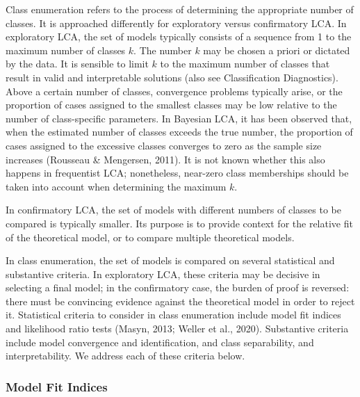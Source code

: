 \documentclass[
  ,man,floatsintext]{apa6}
\begin{document}
Class enumeration refers to the process of determining the appropriate number of classes.
It is approached differently for exploratory versus confirmatory LCA.
In exploratory LCA, the set of models typically consists of a sequence from 1 to the maximum number of classes \(k\).
The number \(k\) may be chosen a priori or dictated by the data.
It is sensible to limit \(k\) to the maximum number of classes that result in valid and interpretable solutions (also see Classification Diagnostics).
Above a certain number of classes,
convergence problems typically arise,
or the proportion of cases assigned to the smallest classes may be low relative to the number of class-specific parameters.
In Bayesian LCA, it has been observed that, when the estimated number of classes exceeds the true number,
the proportion of cases assigned to the excessive classes converges to zero as the sample size increases (Rousseau \& Mengersen, 2011).
It is not known whether this also happens in frequentist LCA;
nonetheless, near-zero class memberships should be taken into account when determining the maximum \(k\).

In confirmatory LCA,
the set of models with different numbers of classes to be compared is typically smaller.
Its purpose is to provide context for the relative fit of the theoretical model, or to compare multiple theoretical models.

In class enumeration, the set of models is compared on several statistical and substantive criteria.
In exploratory LCA, these criteria may be decisive in selecting a final model;
in the confirmatory case, the burden of proof is reversed: there must be convincing evidence against the theoretical model in order to reject it.
Statistical criteria to consider in class enumeration include model fit indices and
likelihood ratio tests (Masyn, 2013; Weller et al., 2020).
Substantive criteria include model convergence and identification, and
class separability,
and interpretability.
We address each of these criteria below.

\hypertarget{model-fit-indices}{%
\subsubsection{Model Fit Indices}\label{model-fit-indices}}
\end{document}
